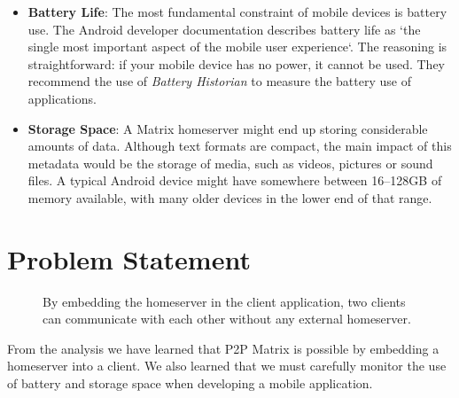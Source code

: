 \begin{itemize}
	\item{
	      \textbf{Battery Life}:
	      The most fundamental constraint of mobile devices is battery use.
	      The Android developer documentation describes battery life as `the single most important aspect of the mobile user experience`\cite{android_devdocs_power}.
	      The reasoning is straightforward: if your mobile device has no power, it cannot be used.
	      They recommend the use of \textit{Battery Historian}\cite{battery_historian} to measure the battery use of applications.
	      }
	\item{
	      \textbf{Storage Space}:
	      A Matrix homeserver might end up storing considerable amounts of data.
	      Although text formats are compact, the main impact of this metadata would be the storage of media, such as videos, pictures or sound files.
	      A typical Android device might have somewhere between 16--128GB of memory available, with many older devices in the lower end of that range.
	      }
\end{itemize}


\section{Problem Statement}\label{sec:problem_statement}

\begin{figure}
	\centering
	\resizebox{!}{!}{}
	\caption{
		By embedding the homeserver in the client application, two clients can communicate with each other without any external homeserver.
	}%
	\label{fig:p2p-embed}
\end{figure}
From the analysis we have learned that \ac{P2P} Matrix is possible by embedding a homeserver into a client.
We also learned that we must carefully monitor the use of battery and storage space when developing a mobile application.

